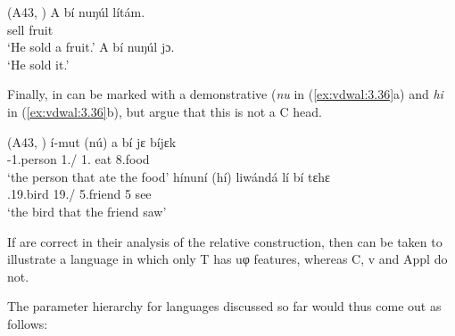 \documentclass[output=paper]{langsci/langscibook}
\begin{document}
\ea\label{ex:vdwal:3.35}  (A43, \citealt[278]{Hyman2003})\label{bkm:Ref347562250}
    \ea
    \gll A  bí  nuŋúl  lítám.\\
        \Sm{}  \Ppp{}  sell  fruit  \\
    \glt    ‘He sold a fruit.’
    \ex A  bí  nuŋúl  jɔ.\\
        ‘He sold it.’
    \z
\z

Finally,  in  can be marked with a demonstrative
(\emph{nu} in (\ref{ex:vdwal:3.36}a) and \emph{hi} in (\ref{ex:vdwal:3.36}b), but
\citet{JenksEtAl2017} argue that this is not a C head.

\ea\label{ex:vdwal:3.36}  (A43, \citealt[19, 20]{JenksEtAl2017}) \label{bkm:Ref347562274}
    \ea
    \gll    í-mut  (nú)  a  bí  \ds{}jɛ  bíjɛk\\
            \Aug{}{}-1.person  1.\Rel/\Dem{}  1.\Sm{}  \Ppp{}  eat  8.food\\
    \glt        ‘the person that ate the food’
    \ex\label{bkm:Ref347929302}
    \gll    hínuní  (hí)  liwándá  lí  bí  \ds{}tɛhɛ\\
            \Aug{}.19.bird  19.\Rel/\Dem{}  5.friend  5\Sm{}  \Ppp{}  see\\
    \glt        ‘the bird that the friend saw’
    \z
\z

If \citet{JenksEtAl2017} are correct in their analysis of the relative
construction, then  can be taken to illustrate a language in which
only T has uφ features, whereas C, v and Appl do not.

The parameter hierarchy for  languages
discussed so far would thus come out as follows:\largerpage
\end{document}
